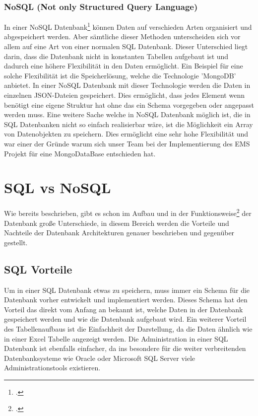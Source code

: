 \subsubsection{NoSQL (Not only Structured Query Language)}	
In einer NoSQL Datenbank\footcite{mongodb} können Daten auf verschieden Arten organisiert und abgespeichert werden. Aber sämtliche dieser Methoden unterscheiden sich vor allem auf eine Art von einer normalen SQL Datenbank. 
Dieser Unterschied liegt darin, dass die Datenbank nicht in konstanten Tabellen aufgebaut ist und dadurch eine höhere Flexibilität in den Daten ermöglicht. 
Ein Beispiel für eine solche Flexibilität ist die Speicherlösung, welche die Technologie 'MongoDB' anbietet. In einer NoSQL Datenbank mit dieser Technologie werden die Daten in einzelnen JSON-Dateien gespeichert. 
Dies ermöglicht, dass jedes Element wenn benötigt eine eigene Struktur hat ohne das ein Schema vorgegeben oder angepasst werden muss. 
Eine weitere Sache welche in NoSQL Datenbank möglich ist, die in SQL Datenbanken nicht so einfach realisierbar wäre, ist die Möglichkeit ein Array von Datenobjekten zu speichern. 
Dies ermöglicht eine sehr hohe Flexibilität und war einer der Gründe warum sich unser Team bei der Implementierung des EMS Projekt für eine MongoDataBase entschieden hat.
\section{SQL vs NoSQL} 
Wie bereits beschrieben, gibt es schon im Aufbau und in der Funktionsweise\footcite{sqlvsnosql} der Datenbank große Unterschiede, in diesem Bereich werden die Vorteile und Nachteile der Datenbank Architekturen genauer beschrieben und gegenüber gestellt.
\subsection{SQL Vorteile}
Um in einer SQL Datenbank etwas zu speichern, muss immer ein Schema für die Datenbank vorher entwickelt und implementiert werden. 
Dieses Schema hat den Vorteil das direkt vom Anfang an bekannt ist, welche Daten in der Datenbank gespeichert werden und wie die Datenbank aufgebaut wird. 
Ein weiterer Vorteil des Tabellenaufbaus ist die Einfachheit der Darstellung, da die Daten ähnlich wie in einer Excel Tabelle angezeigt werden. 
Die Administration in einer SQL Datenbank ist ebenfalls einfacher, da ins besondere für die weiter verbreitenden Datenbanksysteme wie Oracle oder Microsoft SQL Server viele Administrationstools existieren.
